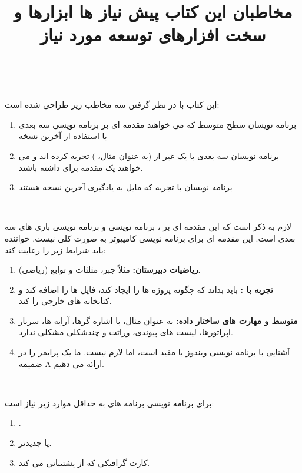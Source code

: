 \newpage

\title{
    \LARGE
    \textbf{مخاطبان این کتاب}
}
\\[25pt] %
{\large
این کتاب با در نظر گرفتن سه مخاطب زیر طراحی شده است:
    \begin{enumerate}
        \item {برنامه نویسان سطح متوسط  که می خواهند مقدمه ای بر برنامه نویسی سه بعدی با استفاده از آخرین نسخه }
        \item {برنامه نویسان سه بعدی با یک  غیر از  (به عنوان مثال، ) تجربه کرده اند و می خواهند یک مقدمه برای  داشته باشند.}
        \item {برنامه نویسان با تجربه  که مایل به یادگیری آخرین نسخه  هستند}
    \end{enumerate}
}

\title{
    \LARGE
    \textbf{پیش نیاز ها}
}
\\[25pt] %
{\large
لازم به ذکر است که این مقدمه ای بر ، برنامه نویسی  و برنامه نویسی بازی های سه بعدی است. این مقدمه ای برای برنامه نویسی کامپیوتر به صورت کلی نیست. خواننده باید شرایط زیر را رعایت کند:
    \begin{enumerate}
        \item {\textbf{ریاضیات دبیرستان: } مثلاً جبر، مثلثات و توابع (ریاضی).}
        \item {\textbf{تجربه با :} باید بداند که چگونه پروژه ها را ایجاد کند، فایل ها را اضافه کند و کتابخانه های خارجی را  کند.}
        \item {\textbf{ متوسط و مهارت های ساختار داده:} به عنوان مثال، با اشاره گرها، آرایه ها، سربار اپراتورها، لیست های پیوندی، وراثت و چندشکلی مشکلی ندارد.}
        \item {آشنایی با برنامه نویسی ویندوز با  مفید است، اما لازم نیست. ما یک پرایمر  را در ضمیمه A ارائه می دهیم.}
    \end{enumerate}
}

\title{
    \LARGE
    \textbf{ابزارها و سخت افزارهای توسعه مورد نیاز}
}
\\[25pt] %
{\large
برای برنامه نویسی برنامه های  به حداقل موارد زیر نیاز است:
    \begin{enumerate}
        \item {.}
        \item { یا جدیدتر.}
        \item {کارت گرافیکی که از  پشتیبانی می کند.}
    \end{enumerate}
}

